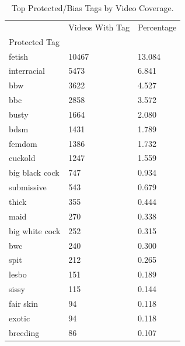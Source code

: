 \begin{table}[htbp]
\centering
\caption{Top Protected/Bias Tags by Video Coverage.}
\label{tab:eda_top_protected_tags}
\begin{tabular}{lll}
\toprule
 & Videos With Tag & Percentage \\
Protected Tag &  &  \\
\midrule
fetish & 10467 & 13.084 \\
interracial & 5473 & 6.841 \\
bbw & 3622 & 4.527 \\
bbc & 2858 & 3.572 \\
busty & 1664 & 2.080 \\
bdsm & 1431 & 1.789 \\
femdom & 1386 & 1.732 \\
cuckold & 1247 & 1.559 \\
big black cock & 747 & 0.934 \\
submissive & 543 & 0.679 \\
thick & 355 & 0.444 \\
maid & 270 & 0.338 \\
big white cock & 252 & 0.315 \\
bwc & 240 & 0.300 \\
spit & 212 & 0.265 \\
lesbo & 151 & 0.189 \\
sissy & 115 & 0.144 \\
fair skin & 94 & 0.118 \\
exotic & 94 & 0.118 \\
breeding & 86 & 0.107 \\
\bottomrule
\end{tabular}

\end{table}
